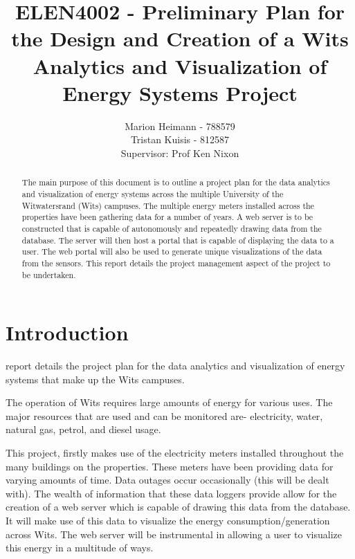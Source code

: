 \documentclass[12pt,onecolumn]{IEEEtran}
\begin{document}
\author{Marion Heimann - 788579 \\ Tristan Kuisis - 812587 \\ Supervisor: Prof Ken Nixon}
\title{ELEN4002 - Preliminary Plan for the Design and Creation of a Wits Analytics and Visualization of Energy Systems Project}
\maketitle
\begin{abstract}
    The main purpose of this document is to outline a project plan for the data analytics and visualization of energy systems across the multiple University of the Witwatersrand (Wits) campuses. The multiple energy meters installed across the properties have been gathering data for a number of years. A web server is to be constructed that is capable of autonomously and repeatedly drawing data from the database. The server will then host a portal that is capable of displaying the data to a user. The web portal will also be used to generate unique visualizations of the data from the sensors.
    This report details the project management aspect of the project to be undertaken.
\end{abstract}
\pagestyle{plain}



\section{Introduction} \label{sec:Introduction}
 report details the project plan for the data analytics and visualization of energy systems that make up the Wits campuses. 

The operation of Wits requires large amounts of energy for various uses. The major resources that are used and can be monitored are- electricity, water, natural gas, petrol, and diesel usage.

This project, firstly makes use of the electricity meters installed throughout the many buildings on the properties. These meters have been providing data for varying amounts of time. Data outages occur occasionally (this will be dealt with). 
The wealth of information that these data loggers provide allow for the creation of a web server which is capable of drawing this data from the database. It will make use of this data to visualize the energy consumption/generation across Wits. The web server will be instrumental in allowing a user to visualize this energy in a multitude of ways.
\end{document}
